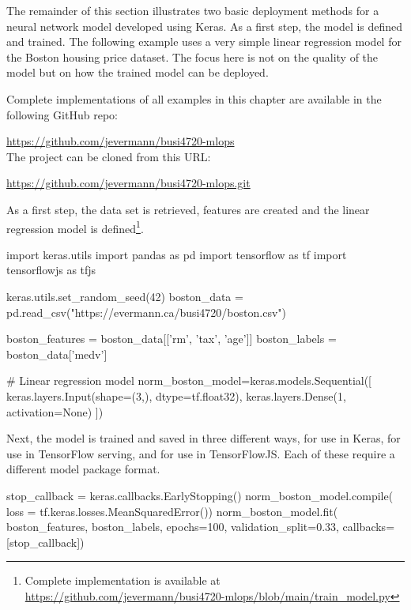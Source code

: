\begin{withcode}
The remainder of this section illustrates two basic deployment methods for a neural network model developed using Keras. As a first step, the model is defined and trained. The following example uses a very simple linear regression model for the Boston housing price dataset. The focus here is not on the quality of the model but on how the trained model can be deployed. 

\begin{resourcebox}
Complete implementations of all examples in this chapter are available in the following GitHub repo:

\url{https://github.com/jevermann/busi4720-mlops} \\

The project can be cloned from this URL:

\url{https://github.com/jevermann/busi4720-mlops.git}
\end{resourcebox}

As a first step, the data set is retrieved, features are created and the linear regression model is defined\footnote{
Complete implementation is available at \url{https://github.com/jevermann/busi4720-mlops/blob/main/train_model.py}}. \\

\begin{pythoncode}
import keras.utils
import pandas as pd
import tensorflow as tf
import tensorflowjs as tfjs

keras.utils.set_random_seed(42)
boston_data = pd.read_csv("https://evermann.ca/busi4720/boston.csv")

boston_features = boston_data[['rm', 'tax', 'age']]
boston_labels = boston_data['medv']

# Linear regression model
norm_boston_model=keras.models.Sequential([
    keras.layers.Input(shape=(3,), dtype=tf.float32),
    keras.layers.Dense(1, activation=None) ])
\end{pythoncode}

Next, the model is trained and saved in three different ways, for use in Keras, for use in TensorFlow serving, and for use in TensorFlowJS. Each of these require a different model package format.

\begin{pythoncode}
stop_callback = keras.callbacks.EarlyStopping()
norm_boston_model.compile(
    loss = tf.keras.losses.MeanSquaredError())
norm_boston_model.fit(
    boston_features, boston_labels,
    epochs=100, validation_split=0.33,
    callbacks=[stop_callback])


\end{pythoncode}
\end{withcode}
